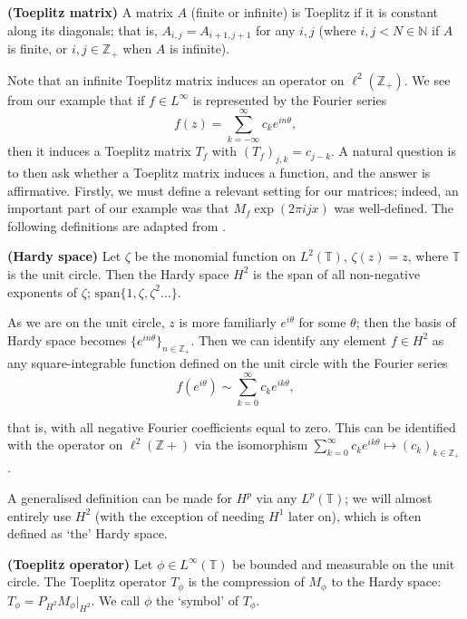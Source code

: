 \documentclass[../main.tex]{subfiles}
\begin{document}
\begin{definition}{\textbf{(Toeplitz matrix)}}
A matrix $A$ (finite or infinite) is Toeplitz if it is constant along its diagonals; that is, $A_{i,j} = A_{i+1,j+1}$
for any $i, j$ (where $i,j < N \in \mathbb{N}$ if $A$ is finite, or $i,j \in \mathbb{Z}_+$ when $A$ is infinite).
\end{definition}

Note that an infinite Toeplitz matrix induces an operator on $\ell^2(\mathbb{Z}_+)$.
We see from our example that if $f \in L^\infty$ is represented by the Fourier series
$$f(z) = \sum_{k=-\infty}^{\infty} c_k e^{i n \theta},$$
then it induces a Toeplitz matrix $T_f$ with $(T_f)_{j,k} = c_{j-k}$.
A natural question is to then ask whether a Toeplitz matrix induces a function, and the answer is affirmative. Firstly, we must define a relevant setting for our matrices; indeed, an important part of our
example was that $M_f \exp(2 \pi i j x)$ was well-defined. The following definitions are adapted from \parencite{arveson2002short}.

\begin{definition}{\textbf{(Hardy space)}}
Let $\zeta$ be the monomial function on $L^2(\mathbb{T})$, $\zeta(z) = z$, where $\mathbb{T}$ is the unit circle. Then the
Hardy space $H^2$ is the span of all non-negative exponents of $\zeta$; $\text{span}\{1, \zeta, \zeta^2 \hdots\}$.
\end{definition}

As we are on the unit circle, $z$ is more familiarly $e^{i \theta}$ for some $\theta$; then the basis of Hardy space becomes $\{e^{i n \theta}\}_{n \in \mathbb{Z}_+}$. Then we can identify any element $f \in H^2$ as any square-integrable function defined on the unit circle with the Fourier series 
$$f(e^{i \theta}) \sim \sum_{k=0}^\infty c_k e^{i k \theta},$$

that is, with all negative Fourier coefficients equal to zero. This can be identified with the operator on $\ell^2(\mathbb{Z}+)$ via the isomorphism $\sum_{k=0}^\infty c_k e^{i k \theta} \mapsto (c_k)_{k \in \mathbb{Z}_+}$ \parencite{bottcher1990analysis}.

 A generalised definition can be made for $H^p$ via any $L^p(\mathbb{T})$; we will almost entirely use $H^2$ (with the exception of needing $H^1$ later on), which is often defined as `the' Hardy space.

\begin{definition}{\textbf{(Toeplitz operator)}}
Let $\phi \in L^{\infty}(\mathbb{T})$ be bounded and measurable on the unit circle. The Toeplitz operator $T_\phi$ is the compression of $M_\phi$ 
to the Hardy space: $T_{\phi} = P_{H^2} M_\phi \big|_{H^2}$. We call $\phi$ the `symbol' of $T_\phi$.
\end{definition}
\end{document}
